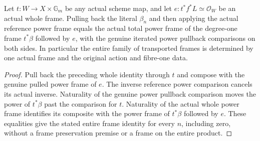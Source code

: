 \begin{theorem}\label{thm:native-tc-product-power-frame-coherence}
\leanok
{}
Let $t:W\to X\times\mathbb G_m$ be any actual scheme map, and let
$e:t^*f^*L\simeq\mathcal O_W$ be an actual whole frame. Pulling
back the literal $\beta_n$ and then applying the actual reference
power frame equals the actual total power frame of the degree-one
frame $t^*\beta$ followed by $e$, with the genuine iterated power
pullback comparisons on both sides. In particular the entire
family of transported frames is determined by one actual frame
and the original action and fibre-one data.
\end{theorem}
\begin{proof}
Pull back the preceding whole identity through $t$ and compose
with the genuine pulled power frame of $e$. The inverse reference
power comparison cancels its actual inverse. Naturality of the
genuine power pullback comparison moves the power of $t^*\beta$
past the comparison for $t$. Naturality of the actual whole power
frame identifies its composite with the power frame of
$t^*\beta$ followed by $e$. These equalities give the stated entire
frame identity for every $n$, including zero, without a frame
preservation premise or a frame on the entire product.
\end{proof}
